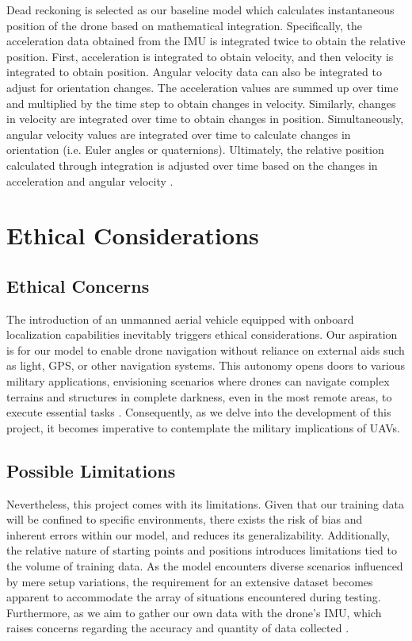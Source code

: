 \documentclass{article} %
\begin{document}
Dead reckoning is selected as our baseline model which calculates instantaneous position of the drone based on mathematical integration. Specifically, the acceleration data obtained from the IMU is integrated twice to obtain the relative position. First, acceleration is integrated to obtain velocity, and then velocity is integrated to obtain position. Angular velocity data can also be integrated to adjust for orientation changes. The acceleration values are summed up over time and multiplied by the time step to obtain changes in velocity. Similarly, changes in velocity are integrated over time to obtain changes in position. Simultaneously, angular velocity values are integrated over time to calculate changes in orientation (i.e. Euler angles or quaternions). Ultimately, the relative position calculated through integration is adjusted over time based on the changes in acceleration and angular velocity \citep{advanced_navigation_pdr}.


\section{Ethical Considerations}

\subsection{Ethical Concerns}
The introduction of an unmanned aerial vehicle equipped with onboard localization capabilities inevitably triggers ethical considerations. Our aspiration is for our model to enable drone navigation without reliance on external aids such as light, GPS, or other navigation systems. This autonomy opens doors to various military applications, envisioning scenarios where drones can navigate complex terrains and structures in complete darkness, even in the most remote areas, to execute essential tasks \citep{britannica_uavs}. Consequently, as we delve into the development of this project, it becomes imperative to contemplate the military implications of UAVs. 


\subsection{Possible Limitations}
Nevertheless, this project comes with its limitations. Given that our training data will be confined to specific environments, there exists the risk of bias and inherent errors within our model, and reduces its generalizability. Additionally, the relative nature of starting points and positions introduces limitations tied to the volume of training data. As the model encounters diverse scenarios influenced by mere setup variations, the requirement for an extensive dataset becomes apparent to accommodate the array of situations encountered during testing. Furthermore, as we aim to gather our own data with the drone’s IMU, which raises concerns regarding the accuracy and quantity of data collected \citep{inertiallabs_imu}.
\end{document}

